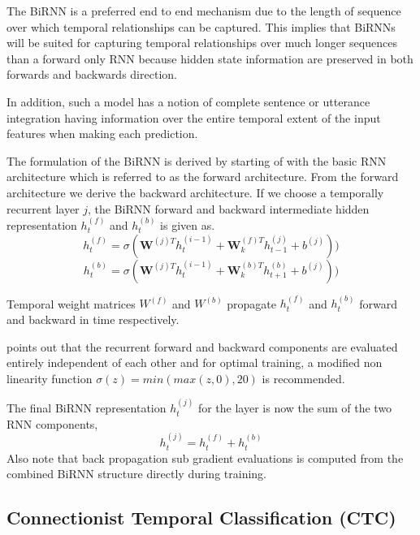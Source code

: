 The BiRNN is a preferred end to end mechanism due to the length of sequence over which temporal relationships can be captured.  This implies that BiRNNs will be suited for capturing temporal relationships over much longer sequences than a forward only RNN because hidden state information are preserved in both forwards and backwards direction. 

In addition, such a model has a notion of complete sentence or utterance  integration having information over the entire temporal extent of the input features when making each prediction. 

The formulation of the BiRNN is derived by starting of with the basic RNN architecture which is referred to as the forward architecture.  From the forward architecture we derive the backward architecture. If we choose a temporally recurrent layer $j$, the BiRNN forward and backward intermediate hidden representation $h^{(f)}_t$ and $h^{(b)}_t$ is given as. 
\begin{equation}h_t^{(f)}=\sigma(\mathbf{W}^{(j)T}h_t^{(i-1)}+\mathbf{W}^{(f)T}_kh_{t-1}^{(j)}+b^{(j)}))
\label{eqn_c3_ds01}\end{equation}
\begin{equation}h_t^{(b)}=\sigma(\mathbf{W}^{(j)T}h_t^{(i-1)}+\mathbf{W}^{(b)T}_kh_{t+1}^{(b)}+b^{(j)}))
\label{eqn_c3_ds02}\end{equation}

Temporal weight matrices $W^{(f)}$ and $W^{(b)}$ propagate $h^{(f)}_t$  and $h^{(b)}_t$ forward and backward in time respectively. 

\cite{hanun2014first} points out that the recurrent forward and backward components are evaluated entirely independent of each other and for optimal training, a modified non linearity function $\sigma(z) = min(max(z, 0), 20)$ is recommended. 

The final BiRNN representation $h^{(j)}_t$ for the layer is now the sum of the two RNN components,
 \begin{equation}h_t^{(j)}=h_t^{(f)}+h_t^{(b)}
\label{eqn_c3_ds03}\end{equation}
Also note that back propagation sub gradient evaluations is computed from the combined BiRNN structure directly during training.

\subsection{Connectionist Temporal Classification (CTC)}
